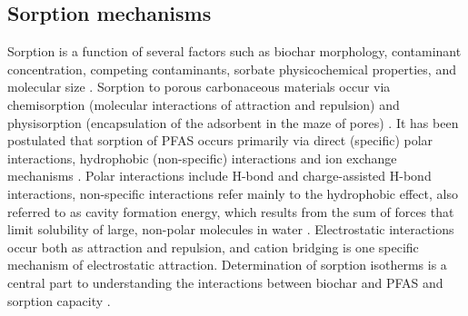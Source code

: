 \subsection{Sorption mechanisms}\label{sec:mechanisms}
Sorption is a function of several factors such as biochar morphology, contaminant concentration, competing contaminants, sorbate physicochemical properties, and molecular size \citep{Li2019,du2014adsorption}. Sorption to porous carbonaceous materials occur via chemisorption (molecular interactions of attraction and repulsion) and physisorption (encapsulation of the adsorbent in the maze of pores) \citep{Li2019}. It has been postulated that sorption of PFAS occurs primarily via direct (specific) polar interactions, hydrophobic (non-specific) interactions and ion exchange mechanisms \citep{Hale2017fire,yu2009sorption}. Polar interactions include H-bond and charge-assisted H-bond interactions, non-specific interactions refer mainly to the hydrophobic effect, also referred to as cavity formation energy, which results from the sum of forces that limit solubility of large, non-polar molecules in water \citep{Arp2006,sigmund2022sorption}. Electrostatic interactions occur both as attraction and repulsion, and cation bridging is one specific mechanism of electrostatic attraction. Determination of sorption isotherms is a central part to understanding the interactions between biochar and PFAS and sorption capacity \citep{yu2009sorption,Li2019}.








